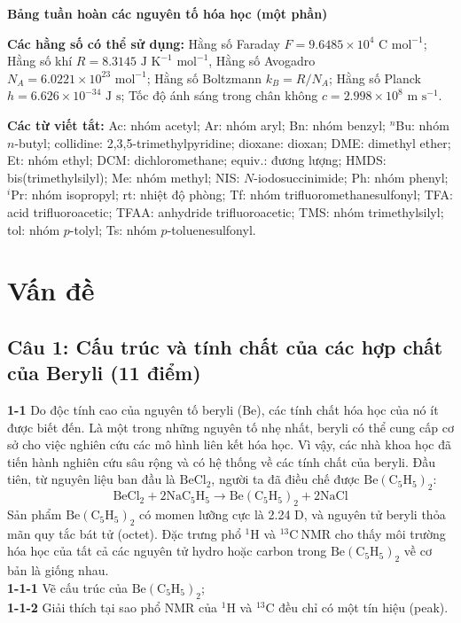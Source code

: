 \vspace{1cm}
\begin{center}
    \textbf{Bảng tuần hoàn các nguyên tố hóa học (một phần)}
\end{center}
\begin{figure}[ht!]
    \centering
\end{figure}

\newpage
\noindent
\textbf{Các hằng số có thể sử dụng:} Hằng số Faraday $F = 9.6485 \times 10^4 \text{ C mol}^{-1}$; Hằng số khí $R = 8.3145 \text{ J K}^{-1}\text{ mol}^{-1}$, Hằng số Avogadro $N_A = 6.0221 \times 10^{23} \text{ mol}^{-1}$; Hằng số Boltzmann $k_B = R/N_A$; Hằng số Planck $h = 6.626 \times 10^{-34} \text{ J s}$; Tốc độ ánh sáng trong chân không $c = 2.998 \times 10^8 \text{ m s}^{-1}$.

\vspace{0.5cm}

\noindent
\textbf{Các từ viết tắt:} Ac: nhóm acetyl; Ar: nhóm aryl; Bn: nhóm benzyl; $^n$Bu: nhóm $n$-butyl; collidine: 2,3,5-trimethylpyridine; dioxane: dioxan; DME: dimethyl ether; Et: nhóm ethyl; DCM: dichloromethane; equiv.: đương lượng; HMDS: bis(trimethylsilyl); Me: nhóm methyl; NIS: $N$-iodosuccinimide; Ph: nhóm phenyl; $^i$Pr: nhóm isopropyl; rt: nhiệt độ phòng; Tf: nhóm trifluoromethanesulfonyl; TFA: acid trifluoroacetic; TFAA: anhydride trifluoroacetic; TMS: nhóm trimethylsilyl; tol: nhóm $p$-tolyl; Ts: nhóm $p$-toluenesulfonyl.


\newpage
\section{Vấn đề}
\subsection{Câu 1: Cấu trúc và tính chất của các hợp chất của Beryli (11 điểm)}

\noindent
\textbf{1-1} Do độc tính cao của nguyên tố beryli (Be), các tính chất hóa học của nó ít được biết đến. Là một trong những nguyên tố nhẹ nhất, beryli có thể cung cấp cơ sở cho việc nghiên cứu các mô hình liên kết hóa học. Vì vậy, các nhà khoa học đã tiến hành nghiên cứu sâu rộng và có hệ thống về các tính chất của beryli. Đầu tiên, từ nguyên liệu ban đầu là $\mathrm{BeCl_2}$, người ta đã điều chế được $\mathrm{Be(C_5H_5)_2}$:
\[ \mathrm{BeCl_2 + 2NaC_5H_5 \rightarrow Be(C_5H_5)_2 + 2NaCl} \]
Sản phẩm $\mathrm{Be(C_5H_5)_2}$ có momen lưỡng cực là 2.24 D, và nguyên tử beryli thỏa mãn quy tắc bát tử (octet). Đặc trưng phổ $\mathrm{^1H}$ và $\mathrm{^{13}C\ NMR}$ cho thấy môi trường hóa học của tất cả các nguyên tử hydro hoặc carbon trong $\mathrm{Be(C_5H_5)_2}$ về cơ bản là giống nhau.\\
\textbf{1-1-1} Vẽ cấu trúc của $\mathrm{Be(C_5H_5)_2}$;\\
\textbf{1-1-2} Giải thích tại sao phổ NMR của $\mathrm{^1H}$ và $\mathrm{^{13}C}$ đều chỉ có một tín hiệu (peak).

